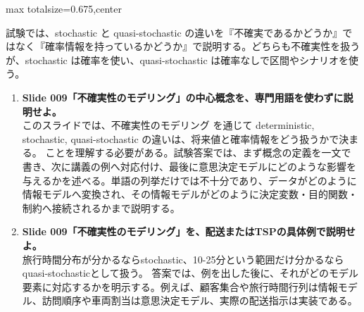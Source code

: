 \begin{adjustbox}{max totalsize={\textwidth}{0.675\textheight},center}
\begin{minipage}{\textwidth}
\begin{minipage}[t]{0.485\textwidth}
試験では、stochastic と quasi-stochastic の違いを『不確実であるかどうか』ではなく『確率情報を持っているかどうか』で説明する。どちらも不確実性を扱うが、stochastic は確率を使い、quasi-stochastic は確率なしで区間やシナリオを使う。\par
{}
\begin{enumerate}
\item \textbf{Slide 009「不確実性のモデリング」の中心概念を、専門用語を使わずに説明せよ。}\\このスライドでは、不確実性のモデリング を通じて deterministic, stochastic, quasi-stochastic の違いは、将来値と確率情報をどう扱うかで決まる。 ことを理解する必要がある。試験答案では、まず概念の定義を一文で書き、次に講義の例へ対応付け、最後に意思決定モデルにどのような影響を与えるかを述べる。単語の列挙だけでは不十分であり、データがどのように情報モデルへ変換され、その情報モデルがどのように決定変数・目的関数・制約へ接続されるかまで説明する。
\item \textbf{Slide 009「不確実性のモデリング」を、配送またはTSPの具体例で説明せよ。}\\旅行時間分布が分かるならstochastic、10-25分という範囲だけ分かるならquasi-stochasticとして扱う。 答案では、例を出した後に、それがどのモデル要素に対応するかを明示する。例えば、顧客集合や旅行時間行列は情報モデル、訪問順序や車両割当は意思決定モデル、実際の配送指示は実装である。
\end{enumerate}
\end{minipage}
\end{minipage}
\end{adjustbox}

